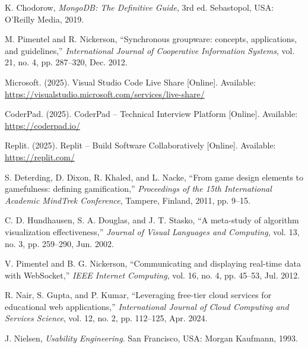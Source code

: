 \documentclass[12pt,a4paper,oneside]{report}
\begin{document}
\begin{enumerate}[label={[\arabic*]}, leftmargin=1.5cm, labelsep=0.5cm, itemsep=0.3cm]
\item K. Chodorow, \textit{MongoDB: The Definitive Guide}, 3rd ed. Sebastopol, USA: O'Reilly Media, 2019.

\item M. Pimentel and R. Nickerson, ``Synchronous groupware: concepts, applications, and guidelines,'' \textit{International Journal of Cooperative Information Systems}, vol. 21, no. 4, pp. 287--320, Dec. 2012.

\item Microsoft. (2025). Visual Studio Code Live Share [Online]. Available: \url{https://visualstudio.microsoft.com/services/live-share/}

\item CoderPad. (2025). CoderPad -- Technical Interview Platform [Online]. Available: \url{https://coderpad.io/}

\item Replit. (2025). Replit -- Build Software Collaboratively [Online]. Available: \url{https://replit.com/}

\item S. Deterding, D. Dixon, R. Khaled, and L. Nacke, ``From game design elements to gamefulness: defining gamification,'' \textit{Proceedings of the 15th International Academic MindTrek Conference}, Tampere, Finland, 2011, pp. 9--15.

\item C. D. Hundhausen, S. A. Douglas, and J. T. Stasko, ``A meta-study of algorithm visualization effectiveness,'' \textit{Journal of Visual Languages and Computing}, vol. 13, no. 3, pp. 259--290, Jun. 2002.

\item V. Pimentel and B. G. Nickerson, ``Communicating and displaying real-time data with WebSocket,'' \textit{IEEE Internet Computing}, vol. 16, no. 4, pp. 45--53, Jul. 2012.

\item R. Nair, S. Gupta, and P. Kumar, ``Leveraging free-tier cloud services for educational web applications,'' \textit{International Journal of Cloud Computing and Services Science}, vol. 12, no. 2, pp. 112--125, Apr. 2024.

\item J. Nielsen, \textit{Usability Engineering}. San Francisco, USA: Morgan Kaufmann, 1993.

\end{enumerate}



\end{document}
